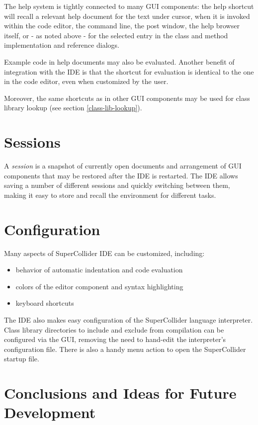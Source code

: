 \documentclass[11pt,a4paper]{article}
\begin{document}
The help system is tightly connected to many GUI components: the help shortcut will recall a relevant help document
for the text under cursor, when it is invoked within the code editor, the command line, the post window, the help
browser itself, or - as noted above - for the selected entry in the class and method implementation and reference
dialogs.

Example code in help documents may also be evaluated. Another benefit of integration with the IDE is that the shortcut
for evaluation is identical to the one in the code editor, even when customized by the user.

Moreover, the same shortcuts as in other GUI components may be used for class library lookup (see section
\ref{class-lib-lookup}).

\section{Sessions}

A \emph{session} is a snapshot of currently open documents and arrangement of GUI components that may be restored
after the IDE is restarted. The IDE allows saving a number of different sessions and quickly switching between them,
making it easy to store and recall the environment for different tasks.

\section{Configuration}

Many aspects of SuperCollider IDE can be customized, including:
\begin{itemize}
 \item behavior of automatic indentation and code evaluation
 \item colors of the editor component and syntax highlighting
 \item keyboard shortcuts
\end{itemize}

The IDE also makes easy configuration of the SuperCollider language interpreter. Class library directories to include
and exclude from compilation can be configured via the GUI, removing the need to hand-edit the interpreter's
configuration file. There is also a handy menu action to open the SuperCollider startup file.

\section{Conclusions and Ideas for Future Development}
\end{document}
